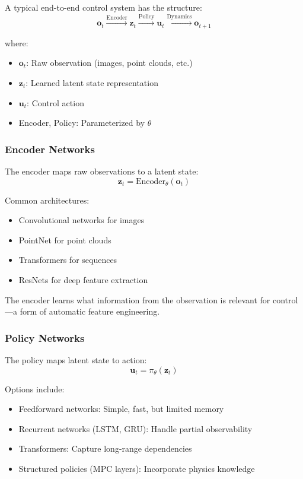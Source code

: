 A typical end-to-end control system has the structure:
\begin{equation}
\mathbf{o}_t \xrightarrow{\text{Encoder}} \mathbf{z}_t \xrightarrow{\text{Policy}} \mathbf{u}_t \xrightarrow{\text{Dynamics}} \mathbf{o}_{t+1}
\end{equation}

where:
\begin{itemize}
    \item $\mathbf{o}_t$: Raw observation (images, point clouds, etc.)
    \item $\mathbf{z}_t$: Learned latent state representation
    \item $\mathbf{u}_t$: Control action
    \item Encoder, Policy: Parameterized by $\theta$
\end{itemize}

\subsubsection{Encoder Networks}

The encoder maps raw observations to a latent state:
\begin{equation}
\mathbf{z}_t = \text{Encoder}_\theta(\mathbf{o}_t)
\end{equation}

Common architectures:
\begin{itemize}
    \item Convolutional networks for images
    \item PointNet for point clouds
    \item Transformers for sequences
    \item ResNets for deep feature extraction
\end{itemize}

The encoder learns what information from the observation is relevant for control---a form of automatic feature engineering.

\subsubsection{Policy Networks}

The policy maps latent state to action:
\begin{equation}
\mathbf{u}_t = \pi_\theta(\mathbf{z}_t)
\end{equation}

Options include:
\begin{itemize}
    \item Feedforward networks: Simple, fast, but limited memory
    \item Recurrent networks (LSTM, GRU): Handle partial observability
    \item Transformers: Capture long-range dependencies
    \item Structured policies (MPC layers): Incorporate physics knowledge
\end{itemize}

